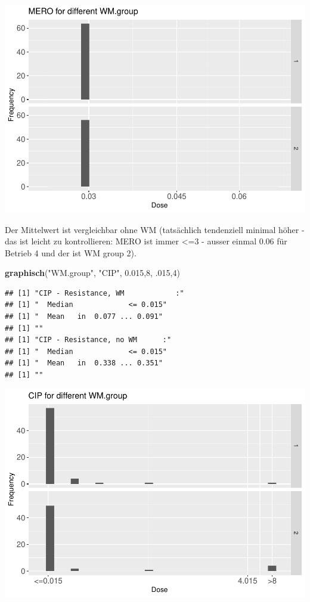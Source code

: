 \documentclass[
]{article}
\newenvironment{Shaded}{\begin{snugshade}}{\end{snugshade}}
\newcommand{\DecValTok}[1]{\textcolor[rgb]{0.00,0.00,0.81}{#1}}
\newcommand{\FloatTok}[1]{\textcolor[rgb]{0.00,0.00,0.81}{#1}}
\newcommand{\KeywordTok}[1]{\textcolor[rgb]{0.13,0.29,0.53}{\textbf{#1}}}
\newcommand{\NormalTok}[1]{#1}
\newcommand{\StringTok}[1]{\textcolor[rgb]{0.31,0.60,0.02}{#1}}
\begin{document}
\includegraphics{Verteilungen_files/figure-latex/unnamed-chunk-32-1.pdf}

Der Mittelwert ist vergleichbar ohne WM (tatsächlich tendenziell minimal
höher - das ist leicht zu kontrollieren: MERO ist immer \textless=3 -
ausser einmal 0.06 für Betrieb 4 und der ist WM group 2).

\begin{Shaded}
\begin{Highlighting}[]
  \KeywordTok{graphisch}\NormalTok{(}\StringTok{"WM.group"}\NormalTok{, }\StringTok{"CIP"}\NormalTok{, }\FloatTok{0.015}\NormalTok{,}\DecValTok{8}\NormalTok{, }\FloatTok{.015}\NormalTok{,}\DecValTok{4}\NormalTok{) }
\end{Highlighting}
\end{Shaded}

\begin{verbatim}
## [1] "CIP - Resistance, WM            :"
## [1] "  Median             <= 0.015"
## [1] "  Mean   in  0.077 ... 0.091"
## [1] ""
## [1] "CIP - Resistance, no WM      :"
## [1] "  Median             <= 0.015"
## [1] "  Mean   in  0.338 ... 0.351"
## [1] ""
\end{verbatim}

\includegraphics{Verteilungen_files/figure-latex/unnamed-chunk-33-1.pdf}
\end{document}
